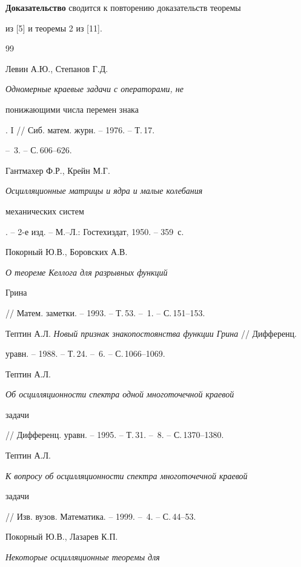 \medskip








{\bf Доказательство} сводится к повторению доказательств теоремы 


из [5] и теоремы 2 из [11].








\begin{thebibliography}{99}







Левин А.Ю., Степанов Г.Д. {\em Одномерные краевые задачи с операторами, не


понижающими числа перемен знака}. I // Сиб. матем. журн. -- 1976. -- Т.\,17.


-- \No\,3. -- С.\,606--626.




Гантмахер Ф.Р., Крейн М.Г. {\em Осцилляционные матрицы и ядра и малые колебания


механических систем}. -- 2-е изд. -- М.--Л.: Гостехиздат, 1950. -- 359~с.




Покорный Ю.В., Боровских А.В. {\em О теореме Келлога для разрывных функций 


Грина} // Матем. заметки. -- 1993. -- Т.\,53. -- \No\,1. -- С.\,151--153.




Тептин А.Л. {\em Новый признак знакопостоянства функции Грина} // Дифференц.


уравн. -- 1988. -- Т.\,24. -- \No\,6. -- С.\,1066--1069.




Тептин А.Л. {\em Об осцилляционности спектра одной многоточечной краевой


задачи} // Дифференц. уравн. -- 1995. -- Т.\,31. -- \No\,8. -- С.\,1370--1380.




Тептин А.Л. {\em К вопросу об осцилляционности спектра многоточечной краевой


задачи} // Изв. вузов. Математика. -- 1999. -- \No\,4. -- С.\,44--53.




Покорный Ю.В., Лазарев К.П. {\em Некоторые осцилляционные теоремы для


}
\end{thebibliography}
